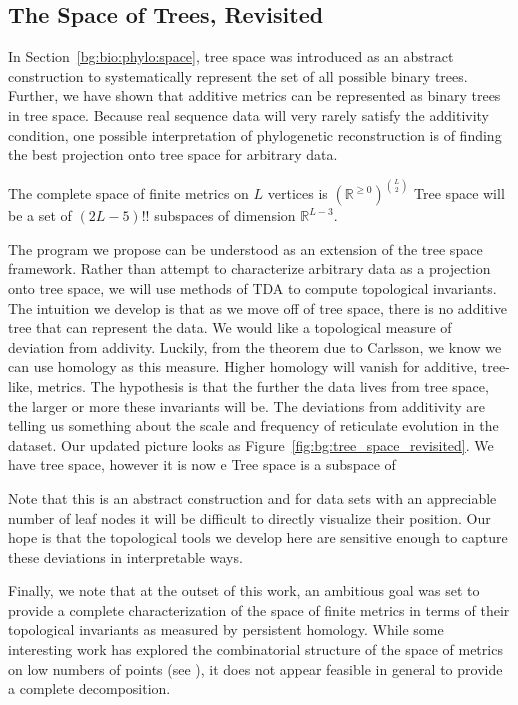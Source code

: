 \subsection{The Space of Trees, Revisited}
\label{bg:top4bio:tree_space}

In Section~\ref{bg:bio:phylo:space}, tree space was introduced as an abstract construction to systematically represent the set of all possible binary trees.
Further, we have shown that additive metrics can be represented as binary trees in tree space.
Because real sequence data will very rarely satisfy the additivity condition, one possible interpretation of phylogenetic reconstruction is of finding the best projection onto tree space for arbitrary data.

The complete space of finite metrics on $L$ vertices is $(\mathbb{R}^{\geq 0})^{\binom{L}{2}}$
Tree space will be a set of $(2L-5)!!$ subspaces of dimension $\mathbb{R}^{L-3}$.

The program we propose can be understood as an extension of the tree space framework.
Rather than attempt to characterize arbitrary data as a projection onto tree space, we will use methods of TDA to compute topological invariants.
The intuition we develop is that as we move off of tree space, there is no additive tree that can represent the data.
We would like a topological measure of deviation from addivity.
Luckily, from the theorem due to Carlsson, we know we can use homology as this measure.
Higher homology will vanish for additive, tree-like, metrics.
The hypothesis is that the further the data lives from tree space, the larger or more these invariants will be.
The deviations from additivity are telling us something about the scale and frequency of reticulate evolution in the dataset.
Our updated picture looks as Figure~\ref{fig:bg:tree_space_revisited}.
We have tree space, however it is now e
Tree space is a subspace of 

Note that this is an abstract construction and for data sets with an appreciable number of leaf nodes it will be difficult to directly visualize their position.
Our hope is that the topological tools we develop here are sensitive enough to capture these deviations in interpretable ways.

Finally, we note that at the outset of this work, an ambitious goal was set to provide a complete characterization of the space of finite metrics in terms of their topological invariants as measured by persistent homology.
While some interesting work has explored the combinatorial structure of the space of metrics on low numbers of points (see \cite{Sturmfels:2004vc}), it does not appear feasible in general to provide a complete decomposition.

